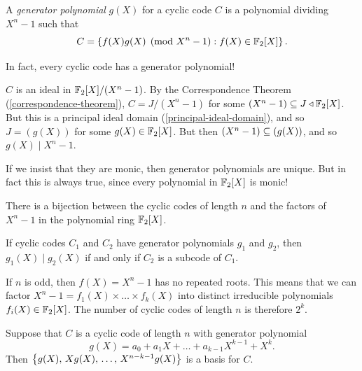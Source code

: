 \documentclass{article}
\begin{document}
\begin{definition}
    A \textit{generator polynomial} $g(X)$ for a cyclic code $C$ is a polynomial dividing $X^n - 1$ such that
    \[
	C = \left\lbrace f(X)g(X) \pmod{X^n - 1} : f(X) \in \mathbb{F}_2[X] \right\rbrace.
	\]
\end{definition}

\begin{theorem}
    In fact, every cyclic code has a generator polynomial!
\end{theorem}

\begin{prf}
    $C$ is an ideal in $\mathbb{F}_2[X] / (X^n - 1)$. By the Correspondence Theorem (\ref{correspondence-theorem}), $C = J/(X^n-1)$ for some $(X^n-1) \subseteq J \triangleleft \mathbb{F}_2[X]$. But this is a principal ideal domain (\ref{principal-ideal-domain}), and so $J = (g(X))$ for some $g(X) \in \mathbb{F}_2[X]$. But then $(X^n - 1) \subseteq (g(X))$, and so $g(X) \mid X^n - 1$.
\end{prf}

\begin{corollary}
    If we insist that they are monic, then generator polynomials are unique. But in fact this is always true, since every polynomial in $\mathbb{F}_2[X]$ is monic!
\end{corollary}

\begin{corollary}
    There is a bijection between the cyclic codes of length $n$ and the factors of $X^n-1$ in the polynomial ring $\mathbb{F}_2[X]$.
\end{corollary}

\begin{corollary}
    If cyclic codes $C_1$ and $C_2$ have generator polynomials $g_1$ and $g_2$, then $g_1(X) \mid g_2(X)$ if and only if $C_2$ is a subcode of $C_1$.
\end{corollary}

\begin{corollary}
    If $n$ is odd, then $f(X) = X^n - 1$ has no repeated roots. This means that we can factor $X^n - 1 = f_1(X) \times \dots \times f_k(X)$ into distinct irreducible polynomials $f_i(X) \in \mathbb{F}_2[X]$. The number of cyclic codes of length $n$ is therefore $2^k$.
\end{corollary}

\begin{proposition}
    Suppose that $C$ is a cyclic code of length $n$ with generator polynomial
    \[
	g(X) = a_0 + a_1X + \dots + a_{k-1} X^{k-1} + X^k.
	\]
	Then $\left\lbrace g(X), \, Xg(X), \, \dots, \, X^{n-k-1}g(X) \right\rbrace$ is a basis for $C$.
\end{proposition}
\end{document}

